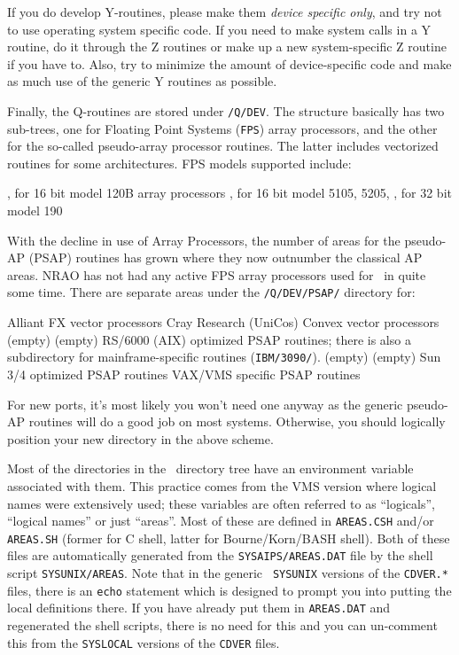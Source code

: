 If you do develop Y-routines, please make them {\it device specific
only\/}, and try not to use operating system specific code.  If you need
to make system calls in a Y routine, do it through the Z routines or
make up a new system-specific Z routine if you have to.  Also, try to
minimize the amount of device-specific code and make as much use of the
generic Y routines as possible.

Finally, the Q-routines are stored under {\tt\thisver/Q/DEV}.  The
structure basically has two sub-trees, one for Floating Point Systems
({\tt FPS}) array processors, and the other for the so-called
pseudo-array processor routines.  The latter includes vectorized
routines for some architectures.  FPS models supported include:
\medskip

{\vbox
{, for 16 bit model 120B array processors}
{, for 16 bit model 5105, 5205, \etc}
{, for 32 bit model 190\medskip}\medskip
}

\noindent With the decline in use of Array Processors, the number of
areas for the pseudo-AP (PSAP) routines has grown where they now
outnumber the classical AP areas.  NRAO has not had any active FPS array
processors used for \AIPS\ in quite some time.  There are separate areas
under the {\tt \thisver/Q/DEV/PSAP/} directory for: \medskip

{ Alliant FX vector processors}
{ Cray Research (UniCos)}
{ Convex vector processors}
{ (empty)}
{ (empty)}
{ RS/6000 (AIX) optimized PSAP routines; there is also
        a subdirectory for mainframe-specific routines ({\tt IBM/3090/}).}
{ (empty)}
{ (empty)}
{ Sun 3/4 optimized PSAP routines}
{ VAX/VMS specific PSAP routines\medskip}\medskip

\noindent
For new ports, it's most likely you won't need one anyway as the generic
pseudo-AP routines will do a good job on most systems.  Otherwise, you
should logically position your new directory in the above scheme.
\medskip


Most of the directories in the \AIPS\ directory tree have an environment
variable associated with them.  This practice comes from the VMS version
where logical names were extensively used; these variables are often
referred to as ``logicals'', ``logical names'' or just ``areas''.  Most
of these are defined in {\tt AREAS.CSH} and/or {\tt AREAS.SH} (former
for C shell, latter for Bourne/Korn/BASH shell).  Both of these files
are automatically generated from the {\tt\dol SYSAIPS/AREAS.DAT} file by
the shell script {\tt\dol SYSUNIX/AREAS}.   Note that in the generic {\tt
\dol SYSUNIX} versions of the {\tt CDVER.*} files, there is an {\tt echo}
statement which is designed to prompt you into putting the local
definitions there.  If you have already put them in {\tt AREAS.DAT} and
regenerated the shell scripts, there is no need for this and you can
un-comment this from the {\tt\dol SYSLOCAL} versions of the {\tt CDVER}
files.


